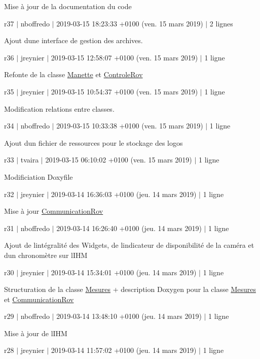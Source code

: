 Mise à jour de la documentation du code

r37 $\vert$ nboffredo $\vert$ 2019-\/03-\/15 18\+:23\+:33 +0100 (ven. 15 mars 2019) $\vert$ 2 lignes

Ajout d\textquotesingle{}une interface de gestion des archives.

r36 $\vert$ jreynier $\vert$ 2019-\/03-\/15 12\+:58\+:07 +0100 (ven. 15 mars 2019) $\vert$ 1 ligne

Refonte de la classe \hyperlink{class_manette}{Manette} et \hyperlink{class_controle_rov}{Controle\+Rov}

r35 $\vert$ jreynier $\vert$ 2019-\/03-\/15 10\+:54\+:37 +0100 (ven. 15 mars 2019) $\vert$ 1 ligne

Modification relations entre classes.

r34 $\vert$ nboffredo $\vert$ 2019-\/03-\/15 10\+:33\+:38 +0100 (ven. 15 mars 2019) $\vert$ 1 ligne

Ajout d\textquotesingle{}un fichier de ressources pour le stockage des logos

r33 $\vert$ tvaira $\vert$ 2019-\/03-\/15 06\+:10\+:02 +0100 (ven. 15 mars 2019) $\vert$ 1 ligne

Modificiation Doxyfile

r32 $\vert$ jreynier $\vert$ 2019-\/03-\/14 16\+:36\+:03 +0100 (jeu. 14 mars 2019) $\vert$ 1 ligne

Mise à jour \hyperlink{class_communication_rov}{Communication\+Rov}

r31 $\vert$ nboffredo $\vert$ 2019-\/03-\/14 16\+:26\+:40 +0100 (jeu. 14 mars 2019) $\vert$ 1 ligne

Ajout de l\textquotesingle{}intégralité des Widgets, de l\textquotesingle{}indicateur de disponibilité de la caméra et d\textquotesingle{}un chronomètre sur l\textquotesingle{}I\+HM

r30 $\vert$ jreynier $\vert$ 2019-\/03-\/14 15\+:34\+:01 +0100 (jeu. 14 mars 2019) $\vert$ 1 ligne

Structuration de la classe \hyperlink{class_mesures}{Mesures} + description Doxygen pour la classe \hyperlink{class_mesures}{Mesures} et \hyperlink{class_communication_rov}{Communication\+Rov}

r29 $\vert$ nboffredo $\vert$ 2019-\/03-\/14 13\+:48\+:10 +0100 (jeu. 14 mars 2019) $\vert$ 1 ligne

Mise à jour de l\textquotesingle{}I\+HM

r28 $\vert$ jreynier $\vert$ 2019-\/03-\/14 11\+:57\+:02 +0100 (jeu. 14 mars 2019) $\vert$ 1 ligne

